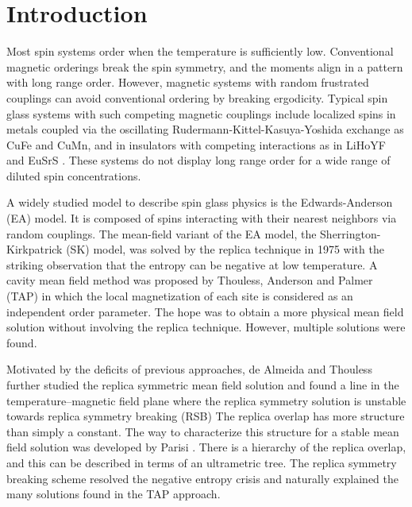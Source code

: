 \documentclass[aps,prb,twocolumn,showpacs,superscriptaddress]{revtex4}
\begin{document}
\section{Introduction} 
Most spin systems order when the temperature is sufficiently low. 
Conventional magnetic orderings break the spin symmetry, and the moments align 
in a pattern with long range order. However, magnetic 
systems with random frustrated couplings can avoid conventional 
ordering by breaking ergodicity. Typical spin glass systems with 
such competing magnetic couplings include localized spins in metals coupled 
via the oscillating Rudermann-Kittel-Kasuya-Yoshida 
exchange as CuFe and CuMn, and in insulators with competing interactions 
as in LiHoYF and EuSrS \cite{Binder-Young-1986,Mydosh-1993,Diep-2004}. These 
systems do not display long range order for a wide range of diluted spin 
concentrations.

A widely studied model to describe spin glass physics is the Edwards-Anderson 
(EA) model\cite{Edwards-Anderson-1975}. It is composed of spins interacting
with their nearest neighbors via random couplings. The mean-field variant of the 
EA model, the Sherrington-Kirkpatrick (SK) model\cite{Sherrington-Kirkpatrick1978,Sherrington-Kirkpatrick-1975},
was solved by the replica technique in 1975 with the striking observation that 
the entropy can be negative at low temperature\cite{Sherrington-Kirkpatrick-1975,Sherrington-Kirkpatrick1978}. 
A cavity mean field method was proposed by Thouless, Anderson 
and Palmer (TAP) in which the local magnetization of each site is considered as 
an independent order parameter\cite{Thouless-Anderson-Palmer-1977}. The hope was to 
obtain a more physical mean field solution without involving the replica technique. 
However, multiple solutions were found\cite{Bray-Moore-1980}.

Motivated by the deficits of previous approaches, de Almeida and Thouless
further studied the replica symmetric mean field solution and found a line 
in the temperature--magnetic field plane where the replica symmetry
solution is unstable towards replica symmetry breaking (RSB) \cite{Almedia-Thouless-1978,Bray-Moore-1978}
The replica overlap has more structure than simply a constant. The way to 
characterize this structure for a stable mean field solution was developed 
by Parisi \cite{Parisi-1980a,Parisi-1980b,Parisi-1980c}.  There is a hierarchy 
of the replica overlap, and this can be described in terms of an ultrametric tree. 
The replica symmetry breaking scheme resolved the negative entropy crisis and naturally 
explained the many solutions found in the TAP approach.
\end{document}
